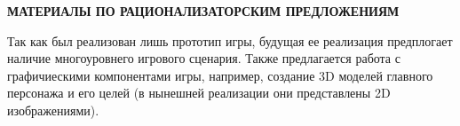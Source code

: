 \begin{center}
\bfseries{\large МАТЕРИАЛЫ ПО РАЦИОНАЛИЗАТОРСКИМ ПРЕДЛОЖЕНИЯМ}
\end{center}
Так как был реализован лишь прототип игры, будущая ее реализация предплогает наличие многоуровнего игрового сценария. Также предлагается работа с графичиескими компонентами игры, например, создание 3D моделей главного персонажа и его целей (в нынешней реализации они представлены 2D изображениями).
\pagebreak